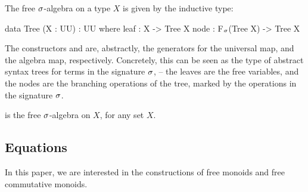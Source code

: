 \begin{definition}
    \label{def:free-algebra-construction}
    The free $\sigma$-algebra on a type $X$ is given by the inductive type:
    \begin{code}
data Tree (X : UU) : UU where
  leaf : X -> Tree X
  node : F$_\sigma$(Tree X) -> Tree X
    \end{code}
\end{definition}
The constructors  and  are, abstractly,
the generators for the universal map, and the algebra map, respectively.
%
Concretely, this can be seen as the type of abstract syntax trees for terms in the signature $\sigma$,
-- the leaves are the free variables, and the nodes are the branching operations of the tree,
marked by the operations in the signature $\sigma$.

\begin{proposition}
    \label{prop:free-algebra-construction-is}
     is the free $\sigma$-algebra on $X$, for any set $X$.
\end{proposition}

\subsection{Equations}
\label{sec:universal-algebra:equations}

In this paper, we are interested in the constructions of free monoids and free commutative monoids.